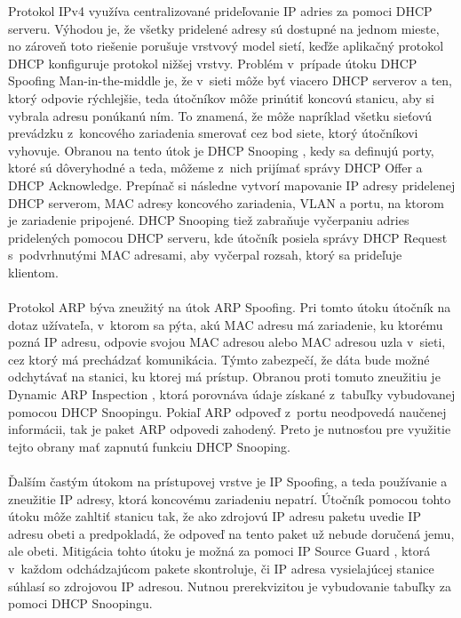 \noindent
Protokol IPv4 využíva centralizované prideľovanie IP adries za pomoci DHCP serveru. Výhodou je, že všetky pridelené adresy sú dostupné na jednom mieste, no zároveň toto riešenie porušuje vrstvový model sietí, keďže aplikačný protokol DHCP konfiguruje protokol nižšej vrstvy. Problém v~prípade útoku DHCP Spoofing Man-in-the-middle je, že v~sieti môže byť viacero DHCP serverov a ten, ktorý odpovie rýchlejšie, teda útočníkov môže prinútiť koncovú stanicu, aby si vybrala adresu ponúkanú ním. To znamená, že môže napríklad všetku sieťovú prevádzku z~koncového zariadenia smerovať cez bod siete, ktorý útočníkovi vyhovuje. Obranou na tento útok je DHCP Snooping \cite{Vyncke2008}\cite{Singh2018}, kedy sa definujú porty, ktoré sú dôveryhodné a teda, môžeme z~nich prijímať správy DHCP Offer a DHCP Acknowledge. Prepínač si následne vytvorí mapovanie IP adresy pridelenej DHCP serverom, MAC adresy koncového zariadenia, VLAN a portu, na ktorom je zariadenie pripojené. 
\newpage
\noindent
DHCP Snooping tiež zabraňuje vyčerpaniu adries pridelených pomocou DHCP serveru, kde útočník posiela správy DHCP Request s~podvrhnutými MAC adresami, aby vyčerpal rozsah, ktorý sa prideľuje klientom.
\\\\   
\noindent
Protokol ARP býva zneužitý na útok ARP Spoofing. Pri tomto útoku útočník na dotaz užívateľa, v~ktorom sa pýta, akú MAC adresu má zariadenie, ku ktorému pozná IP adresu, odpovie svojou MAC adresou alebo MAC adresou uzla v~sieti, cez ktorý má prechádzať komunikácia. Týmto zabezpečí, že dáta bude možné odchytávať na stanici, ku ktorej má prístup. Obranou proti tomuto zneužitiu je Dynamic ARP Inspection \cite{McMillan2018}, ktorá porovnáva údaje získané z~tabuľky vybudovanej pomocou DHCP Snoopingu. Pokiaľ ARP odpoveď z~portu neodpovedá naučenej informácii, tak je paket ARP odpovedi zahodený. Preto je nutnosťou pre využitie tejto obrany mať zapnutú funkciu DHCP Snooping.
\\\\   
\noindent
Ďalším častým útokom na prístupovej vrstve je IP Spoofing, a teda používanie a zneužitie IP adresy, ktorá koncovému zariadeniu nepatrí. Útočník pomocou tohto útoku môže zahltiť stanicu tak, že ako zdrojovú IP adresu paketu uvedie IP adresu obeti a predpokladá, že odpoveď na tento paket už nebude doručená jemu, ale obeti. Mitigácia tohto útoku je možná za pomoci IP Source Guard \cite{Singh2018}, ktorá v~každom odchádzajúcom pakete skontroluje, či IP adresa vysielajúcej stanice súhlasí so zdrojovou IP adresou. Nutnou prerekvizitou je vybudovanie tabuľky za pomoci DHCP Snoopingu.    


